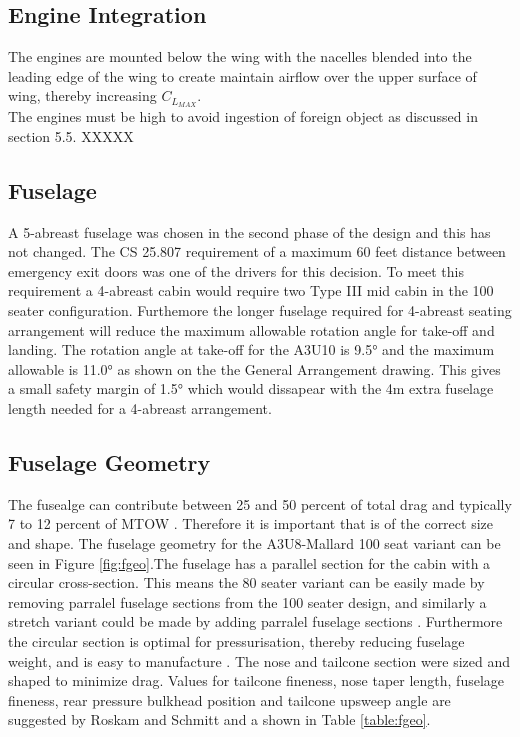 \documentclass[11pt]{article}
\begin{document}
\subsection{Engine Integration}

The engines are mounted below the wing with the nacelles blended into the leading edge of the wing to create maintain airflow over the upper surface of wing, thereby increasing $C_{L_{MAX}}$.\\

The engines must be high to avoid ingestion of foreign object as discussed in section 5.5. XXXXX%


\subsection{Fuselage}

A 5-abreast fuselage was chosen in the second phase of the design and this has not changed. The CS 25.807 \cite{CS25} requirement of a maximum 60 feet distance between emergency exit doors was one of the drivers for this decision. To meet this requirement a 4-abreast cabin would require two Type III mid cabin in the 100 seater configuration. Furthemore the longer fuselage required for 4-abreast seating arrangement will reduce the maximum allowable rotation angle for take-off and landing. The rotation angle at take-off for the A3U10 is \ang{9.5}\cite{josh} and the maximum allowable is \ang{11.0} as shown on the the General Arrangement drawing. This gives a small safety margin of \ang{1.5} which would dissapear with the 4m extra fuselage length needed for a 4-abreast arrangement. 

\subsection{Fuselage Geometry}

The fusealge can contribute between 25 and 50 percent of total drag \cite{R3} and typically 7 to 12 percent of MTOW \cite{jenk}. Therefore it is important that is of the correct size and shape. The fuselage geometry for the A3U8-Mallard 100 seat variant can be seen in Figure \ref{fig:fgeo}.The fuselage has a parallel section for the cabin with a circular cross-section. This means the 80 seater variant can be easily made by removing parralel fuselage sections from the 100 seater design, and similarly a stretch variant could be made by adding parralel fuselage sections \cite{GAPP}. Furthermore the circular section is optimal for pressurisation, thereby reducing fuselage weight, and is easy to manufacture \cite{R2}.  The nose and tailcone section were sized and shaped to minimize drag. Values for tailcone fineness, nose taper length, fuselage fineness, rear pressure bulkhead position and tailcone upsweep angle are suggested by Roskam \cite{R2} and Schmitt \cite{SCHMITT} and a shown in Table \ref{table:fgeo}.
\end{document}
